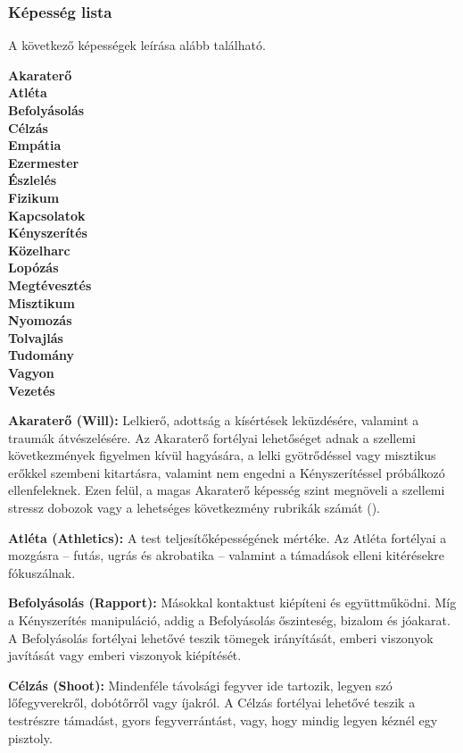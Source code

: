 \subsubsection{Képesség lista}

A következő képességek leírása alább található.

\begin{multicols}{5}
\setlength{\parindent}{0em}
\textbf{%
Akaraterő \\
Atléta \\
Befolyásolás \\
Célzás \\
Empátia \\
Ezermester \\
Észlelés \\
Fizikum \\
Kapcsolatok \\
Kényszerítés \\
Közelharc \\
Lopózás \\
Megtévesztés \\
Misztikum \\
Nyomozás \\
Tolvajlás \\
Tudomány \\
Vagyon \\
Vezetés
}
\end{multicols}

\textbf{Akaraterő (Will):} Lelkierő, adottság a kísértések leküzdésére, valamint a traumák átvészelésére. Az Akaraterő fortélyai lehetőséget adnak a szellemi következmények figyelmen kívül hagyására, a lelki gyötrődéssel vagy misztikus erőkkel szembeni kitartásra, valamint nem engedni a Kényszerítéssel próbálkozó ellenfeleknek. Ezen felül, a magas Akaraterő képesség szint megnöveli a szellemi stressz dobozok vagy a lehetséges következmény rubrikák számát ().

\textbf{Atléta (Athletics):} A test teljesítőképességének mértéke. Az Atléta fortélyai a mozgásra – futás, ugrás és akrobatika – valamint a támadások elleni kitérésekre fókuszálnak.

\textbf{Befolyásolás (Rapport):} Másokkal kontaktust kiépíteni és együttműködni. Míg a Kényszerítés manipuláció, addig a Befolyásolás őszinteség, bizalom és jóakarat. A Befolyásolás fortélyai lehetővé teszik tömegek irányítását, emberi viszonyok javítását vagy emberi viszonyok kiépítését.

\textbf{Célzás (Shoot):} Mindenféle távolsági fegyver ide tartozik, legyen szó lőfegyverekről, dobótőrről vagy íjakról. A Célzás fortélyai lehetővé teszik a testrészre támadást, gyors fegyverrántást, vagy, hogy mindig legyen kéznél egy pisztoly.

